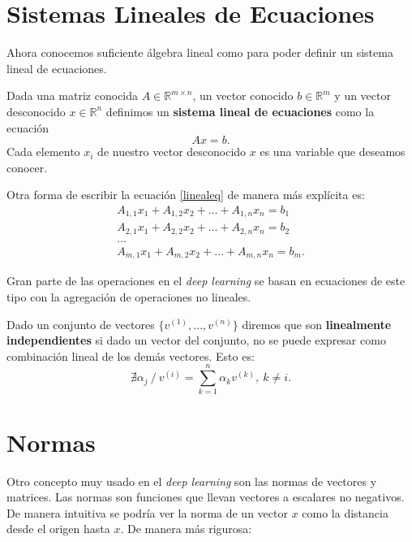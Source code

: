 \section{Sistemas Lineales de Ecuaciones}
Ahora conocemos suficiente álgebra lineal como para poder definir un sistema lineal de ecuaciones.
\begin{definition}
    Dada una matriz conocida $A \in \mathbb{R}^{m \times n}$, un vector conocido $b \in \mathbb{R}^m$ y un vector desconocido $x \in \mathbb{R}^n$ definimos un \textbf{sistema lineal de ecuaciones} como la ecuación
    \begin{equation}\label{linealeq}
        Ax=b.
    \end{equation}
    Cada elemento $x_i$ de nuestro vector desconocido $x$ es una variable que deseamos conocer.
\end{definition}

Otra forma de escribir la ecuación \ref{linealeq} de manera más explícita es:
\begin{equation}
\begin{split}
    A_{1,1}x_1 + A_{1,2}x_2 + \ldots + A_{1,n}x_n = b_1 \\
    A_{2,1}x_1 + A_{2,2}x_2 + \ldots + A_{2,n}x_n = b_2 \\
    \ldots \\
    A_{m,1}x_1 + A_{m,2}x_2 + \ldots + A_{m,n}x_n = b_m.
\end{split}
\end{equation}

Gran parte de las operaciones en el \textit{deep learning} se basan en ecuaciones de este tipo con la agregación de operaciones no lineales.

\begin{definition}
    Dado un conjunto de vectores $\{v^{(1)}, \ldots, v^{(n)} \}$ diremos que son \textbf{linealmente independientes} si dado un vector del conjunto, no se puede expresar como combinación lineal de los demás vectores. Esto es:
    \begin{equation}
        \nexists \alpha_j \ / \ v^{(i)} = \sum_{k=1}^n \alpha_k v^{(k)},\  k \ne i.
    \end{equation}
\end{definition}

\section{Normas}
Otro concepto muy usado en el \textit{deep learning} son las normas de vectores y matrices. Las normas son funciones que llevan vectores a escalares no negativos. De manera intuitiva se podría ver la norma de un vector $x$ como la distancia desde el origen hasta $x$. De manera más rigurosa:

